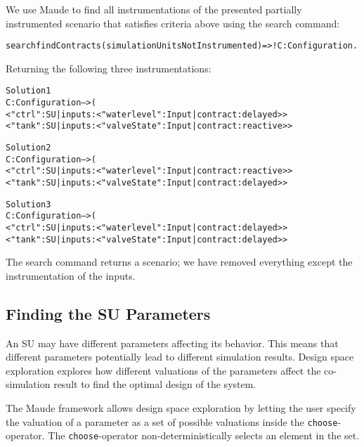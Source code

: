 \begin{example}
We use Maude to find all instrumentations of the presented partially instrumented scenario that satisfies criteria above using the search command: 

\small
\begin{alltt}
search findContracts(simulationUnitsNotInstrumented) =>! C:Configuration .
\end{alltt}
Returning the following three instrumentations:
\begin{alltt}
Solution 1
C:Configuration --> (
< "ctrl" : SU | inputs : < "waterlevel" : Input | contract : delayed > >
< "tank" : SU | inputs : < "valveState" : Input | contract : reactive > >

Solution 2
C:Configuration --> (
< "ctrl" : SU | inputs : < "waterlevel" : Input | contract : reactive > >
< "tank" : SU | inputs : < "valveState" : Input | contract : delayed > >

Solution 3
C:Configuration --> (
< "ctrl" : SU | inputs : < "waterlevel" : Input | contract : delayed > >
< "tank" : SU | inputs : < "valveState" : Input | contract : delayed > >

\end{alltt}
\normalsize

The search command returns a scenario; we have removed everything except the instrumentation of the inputs.
\end{example}

\subsection{Finding the SU Parameters}
An SU may have different parameters affecting its behavior.
This means that different parameters potentially lead to different simulation results.
Design space exploration explores how different valuations of the parameters affect the co-simulation result to find the optimal design of the system. 

The Maude framework allows design space exploration by letting the user specify the valuation of a parameter as a set of possible valuations inside the \texttt{choose}-operator.
The \texttt{choose}-operator non-deterministically selects an element in the set.

